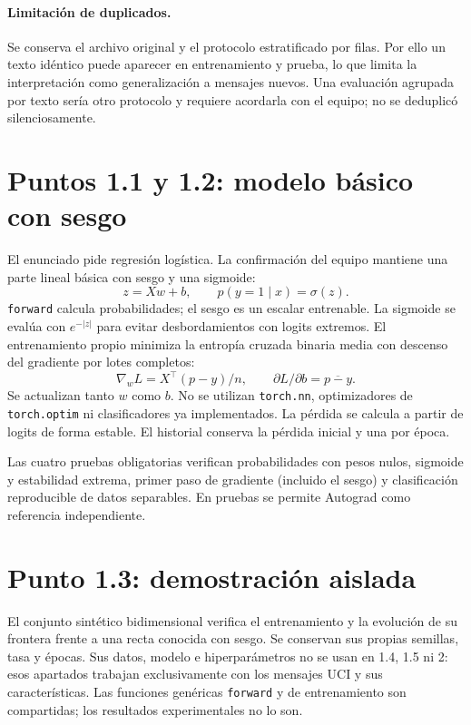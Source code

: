 \documentclass[11pt,letterpaper]{article}
\renewcommand{\_}{\originalunderscore\allowbreak}
\begin{document}
\paragraph{Limitación de duplicados.} Se conserva el archivo original y el
protocolo estratificado por filas. Por ello un texto idéntico puede aparecer
en entrenamiento y prueba, lo que limita la interpretación como generalización
a mensajes nuevos. Una evaluación agrupada por texto sería otro protocolo y
requiere acordarla con el equipo; no se deduplicó silenciosamente.

\section{Puntos 1.1 y 1.2: modelo básico con sesgo}
El enunciado pide regresión logística. La confirmación del equipo mantiene
una parte lineal básica con sesgo y una sigmoide:
\[
 z=Xw+b,\qquad p(y=1\mid x)=\sigma(z).
\]
\texttt{forward} calcula probabilidades; el sesgo es un escalar entrenable.
La sigmoide se evalúa con $e^{-|z|}$ para evitar desbordamientos con logits
extremos. El entrenamiento propio minimiza la entropía cruzada binaria media
con descenso del gradiente por lotes completos:
\[
 \nabla_w L=X^\top(p-y)/n,\qquad \partial L/\partial b=\overline{p-y}.
\]
Se actualizan tanto $w$ como $b$. No se utilizan \texttt{torch.nn},
optimizadores de \texttt{torch.optim} ni clasificadores ya implementados.
La pérdida se calcula a partir de logits de forma estable. El historial
conserva la pérdida inicial y una por época.

Las cuatro pruebas obligatorias verifican probabilidades con pesos nulos,
sigmoide y estabilidad extrema, primer paso de gradiente (incluido el sesgo)
y clasificación reproducible de datos separables. En pruebas se permite
Autograd como referencia independiente.

\section{Punto 1.3: demostración aislada}
El conjunto sintético bidimensional verifica el entrenamiento y la evolución
de su frontera frente a una recta conocida con sesgo. Se conservan sus propias
semillas, tasa y épocas. Sus datos, modelo e hiperparámetros no se usan en
1.4, 1.5 ni 2: esos apartados trabajan exclusivamente con los mensajes UCI y
sus características. Las funciones genéricas \texttt{forward} y de
entrenamiento son compartidas; los resultados experimentales no lo son.
\end{document}
